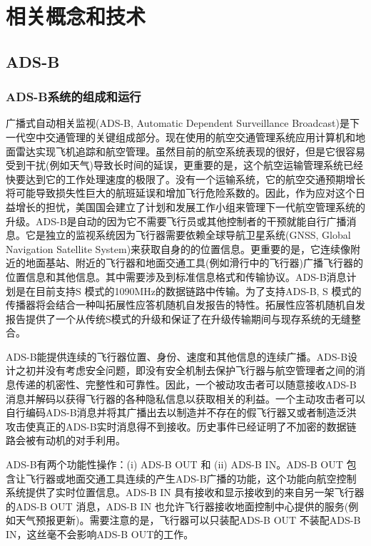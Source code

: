 
\chapter{相关概念和技术}
\section{ADS-B}
\subsection{ADS-B系统的组成和运行}
广播式自动相关监视(ADS-B, Automatic Dependent Surveillance Broadcast)是下一代空中交通管理的关键组成部分。现在使用的航空交通管理系统应用计算机和地面雷达实现飞机追踪和航空管理。虽然目前的航空系统表现的很好，但是它很容易受到干扰(例如天气)导致长时间的延误，更重要的是，这个航空运输管理系统已经快要达到它的工作处理速度的极限了。没有一个运输系统，它的航空交通预期增长将可能导致损失性巨大的航班延误和增加飞行危险系数的。因此，作为应对这个日益增长的担忧，美国国会建立了计划和发展工作小组来管理下一代航空管理系统的升级。ADS-B是自动的因为它不需要飞行员或其他控制者的干预就能自行广播消息。它是独立的监视系统因为飞行器需要依赖全球导航卫星系统(GNSS, Global Navigation Satellite System)来获取自身的的位置信息。更重要的是，它连续像附近的地面基站、附近的飞行器和地面交通工具(例如滑行中的飞行器)广播飞行器的位置信息和其他信息。其中需要涉及到标准信息格式和传输协议。ADS-B消息计划是在目前支持S 模式的1090MHz的数据链路中传输。为了支持ADS-B, S 模式的传播器将会结合一种叫拓展性应答机随机自发报告的特性。拓展性应答机随机自发报告提供了一个从传统S模式的升级和保证了在升级传输期间与现存系统的无缝整合。

ADS-B能提供连续的飞行器位置、身份、速度和其他信息的连续广播\cite{mccallie2011security}。ADS-B设计之初并没有考虑安全问题，即没有安全机制去保护飞行器与航空管理者之间的消息传递的机密性、完整性和可靠性。因此，一个被动攻击者可以随意接收ADS-B消息并解码以获得飞行器的各种隐私信息以获取相关的利益。一个主动攻击者可以自行编码ADS-B消息并将其广播出去以制造并不存在的假飞行器又或者制造泛洪攻击使真正的ADS-B实时消息得不到接收。历史事件已经证明了不加密的数据链路会被有动机的对手利用。

ADS-B有两个功能性操作：(i) ADS-B OUT 和 (ii) ADS-B IN。ADS-B OUT 包含让飞行器或地面交通工具连续的产生ADS-B广播的功能，这个功能向航空控制系统提供了实时位置信息。ADS-B IN 具有接收和显示接收到的来自另一架飞行器的ADS-B OUT 消息，ADS-B IN 也允许飞行器接收地面控制中心提供的服务(例如天气预报更新)。需要注意的是，飞行器可以只装配ADS-B OUT 不装配ADS-B IN，这丝毫不会影响ADS-B OUT的工作。

